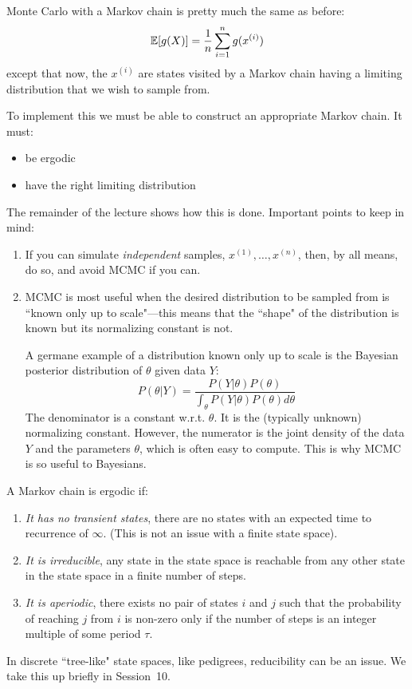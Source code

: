 Monte Carlo with a Markov chain is pretty much the same as before:
\[
	\Bbb{E}[g(X)] = \frac{1}{n}\sum_{i=1}^n g(x^{(i)})
\]
except that now, the $x^{(i)}$ are states visited by a Markov chain having a limiting distribution that we wish to sample from. 

To implement this we must be able to construct an appropriate Markov chain. It must:
\begin{itemize}
\item be ergodic
\item have the right limiting distribution
\end{itemize} 
The remainder of the lecture shows how this is done.
\newpage
Important points to keep in mind:
\begin{enumerate}
\item If you can simulate {\em independent} samples, $x^{(1)},\ldots,x^{(n)}$, then, by all means, do so, and avoid MCMC if you can.
\item MCMC is most useful when the desired distribution to be sampled from is ``known only up to scale"---this means that the ``shape" of the distribution is known but its normalizing constant is not. 

A germane example of a distribution known only up to scale is the Bayesian posterior distribution of $\theta$ given data $Y$:
\[
	P(\theta|Y) = \frac{P(Y|\theta)P(\theta)}
		{\int_\theta P(Y|\theta)P(\theta)d\theta}
\] 
The denominator is a constant w.r.t. $\theta$.  It is the (typically unknown) normalizing constant.  However, the numerator is the joint density of the data $Y$ and the parameters $\theta$, which is often easy to compute. This is why MCMC is so useful to Bayesians.
\end{enumerate}

A Markov chain is ergodic if:
\begin{enumerate}
\item {\sl It has no transient states}, \ie{} there are no states with an expected time to recurrence of $\infty$.  (This is not an issue with a finite state space).
\item {\sl It is irreducible}, \ie{} any state in the state space is reachable from any other state in the state space in a finite number of steps.
\item {\sl It is aperiodic}, \ie{} there exists no pair of states $i$ and $j$ such that the probability of reaching $j$ from $i$ is non-zero only if the number of steps is an integer multiple of some period $\tau$.  
\end{enumerate}
In discrete ``tree-like" state spaces, like pedigrees, reducibility can be an issue.  We take this up briefly in Session~10.


